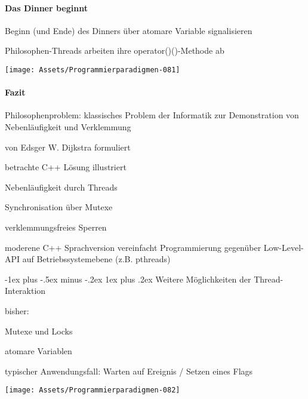 \documentclass[10pt]{article}
\makeatletter
\renewcommand{\subsubsection}{\@startsection{subsubsection}{3}{0mm}%
                                {-1ex plus -.5ex minus -.2ex}%
                                {1ex plus .2ex}%
                                {\normalfont\small\bfseries}}
\makeatother
\begin{document}
\paragraph{Das Dinner beginnt}
\begin{itemize*}
  \item Beginn (und Ende) des Dinners über atomare Variable signalisieren
  \item Philosophen-Threads arbeiten ihre operator()()-Methode ab
\end{itemize*}
\begin{center}
  \texttt{[image: Assets/Programmierparadigmen-081]}
\end{center}

\paragraph{Fazit}
\begin{itemize*}
  \item Philosophenproblem: klassisches Problem der Informatik zur Demonstration von Nebenläufigkeit und Verklemmung
  \item von Edsger W. Dijkstra formuliert
  \item betrachte C++ Lösung illustriert
  \begin{itemize*}
    \item Nebenläufigkeit durch Threads
    \item Synchronisation über Mutexe
    \item verklemmungsfreies Sperren
  \end{itemize*}
  \item moderene C++ Sprachversion vereinfacht Programmierung gegenüber Low-Level-API auf Betriebssystemebene (z.B. pthreads)
\end{itemize*}

\subsubsection{Weitere Möglichkeiten der Thread-Interaktion}
\begin{itemize*}
  \item bisher:
  \begin{itemize*}
    \item Mutexe und Locks
    \item atomare Variablen
  \end{itemize*}
  \item typischer Anwendungsfall: Warten auf Ereignis / Setzen eines Flags
\end{itemize*}
\begin{center}
  \texttt{[image: Assets/Programmierparadigmen-082]}
\end{center}
\end{document}
